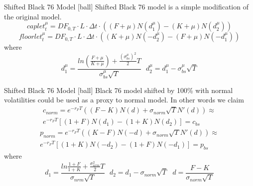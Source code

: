 \documentclass{beamer}
\begin{document}
\begin{frame}{Shifted Black 76 Model}
[ball]
Shifted Black 76 model is a simple modification of the original model.
\begin{equation}
caplet_t^{\mu} = DF_{0, T} \cdot L \cdot \Delta t \cdot \left((F + \mu) N(d_1^{\mu}) - (K + \mu)N(d_2^{\mu})\right)
\end{equation}
\begin{equation}
floorlet_t^{\mu} = DF_{0, T} \cdot L \cdot \Delta t \cdot \left((K + \mu)N(-d_2^{\mu}) - (F + \mu) N(-d_1^{\mu}) \right)
\end{equation}
where
\begin{equation}
d_1^{\mu} = \frac{ln \left(\frac{F + \mu}{K + \mu}\right) + \frac{(\sigma_{bs}^{\mu})^2}{2}T}{\sigma_{bs}^{\mu}\sqrt{T}} ~~~ d_2^{\mu} = d_1^{\mu}  - \sigma_{bs}^{\mu}\sqrt{T}
\end{equation}
\end{frame}

\begin{frame}{Shifted Black 76 Model}
[ball]
Black 76 model shifted by 100\% with normal volatilities could be used as a proxy to normal model. In other words we claim
\begin{multline}
c_{norm} = e^{-r_F T}\left((F - K)N(d) + \sigma_{norm}\sqrt{T}N'(d) \right) \approx\\
e^{-r_F T}[(1 + F)N(d_1) - (1 + K)N(d_2)] = c_{bs}
\end{multline}
\begin{multline}
p_{norm} = e^{-r_F T}\left((K - F)N(-d) + \sigma_{norm}\sqrt{T}N'(d) \right) \approx\\
e^{-r_F T}[(1 + K)N(-d_2) - (1 + F)N(-d_1)] = p_{bs}
\end{multline}
where
\begin{equation}
d_1 = \frac{ln \frac{1 + F}{1 + K} + \frac{\sigma_{nrm}^2}{2}T}{\sigma_{nrm}\sqrt{T}} ~~~ d_2 = d_1 - \sigma_{norm} \sqrt{T} ~~~ d = \frac{F-K}{\sigma_{norm}\sqrt{T}}
\end{equation}
\end{frame}
\end{document}
